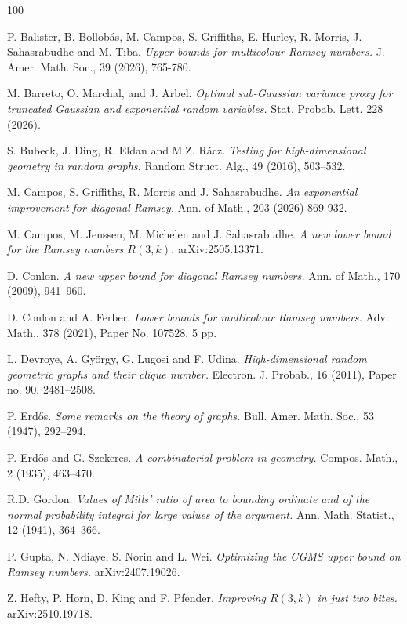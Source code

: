 \documentclass[11pt]{amsart}
\theoremstyle{definition}
\begin{document}
\begin{thebibliography}{100}

P. Balister, B. Bollob\'as, M. Campos, S. Griffiths, E. Hurley, R. Morris, J. Sahasrabudhe and M. Tiba.
\textit{Upper bounds for multicolour Ramsey numbers.}
J. Amer. Math. Soc., 39 (2026), 765-780.

M. Barreto, O. Marchal, and J. Arbel.
\emph{Optimal sub-Gaussian variance proxy for truncated Gaussian and exponential random variables.}
Stat. Probab. Lett. 228 (2026).

S. Bubeck, J. Ding, R. Eldan and M.Z. R\'acz.
\textit{Testing for high-dimensional geometry in random graphs.}
Random Struct. Alg., 49 (2016), 503–532.

M. Campos, S. Griffiths, R. Morris and J. Sahasrabudhe.
\textit{An exponential improvement for diagonal Ramsey.}
Ann. of Math., 203 (2026) 869-932.

M. Campos, M. Jenssen, M. Michelen and J. Sahasrabudhe.
\textit{A new lower bound for the Ramsey numbers $R(3,k)$.}
arXiv:2505.13371.

D. Conlon.
\textit{A new upper bound for diagonal Ramsey numbers.}
Ann. of Math., 170 (2009), 941–960.

D. Conlon and A. Ferber.
\textit{Lower bounds for multicolour Ramsey numbers.}
Adv. Math., 378 (2021), Paper No. 107528, 5 pp.

L. Devroye, A. Gy\"orgy, G. Lugosi and F. Udina.
\textit{High-dimensional random geometric graphs and their clique number.}
Electron. J. Probab., 16 (2011), Paper no. 90, 2481–2508.

P. Erd\H{o}s.
\textit{Some remarks on the theory of graphs.}
Bull. Amer. Math. Soc., 53 (1947), 292–294.

P. Erd\H{o}s and G. Szekeres.
\textit{A combinatorial problem in geometry.}
Compos. Math., 2 (1935), 463–470.

R.D. Gordon.
\textit{Values of Mills' ratio of area to bounding ordinate and of the normal probability integral for large values of the argument.}
Ann. Math. Statist., 12 (1941), 364–366.

P. Gupta, N. Ndiaye, S. Norin and L. Wei.
\textit{Optimizing the CGMS upper bound on Ramsey numbers.}
arXiv:2407.19026.

Z. Hefty, P. Horn, D. King and F. Pfender.
\textit{Improving $R(3,k)$ in just two bites.}
arXiv:2510.19718.


\end{thebibliography}
\end{document}
